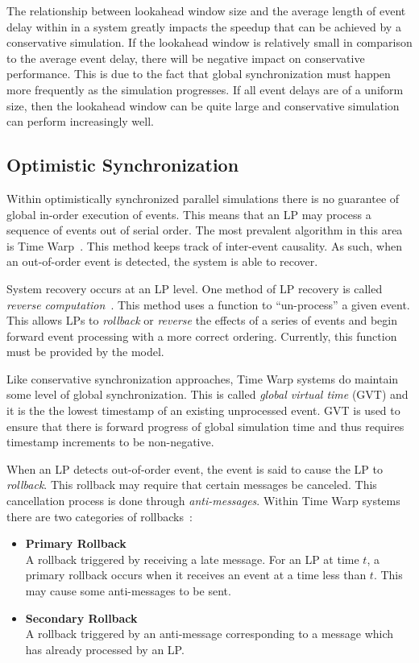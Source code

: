 The relationship between lookahead window size and the average length of event delay within in a system greatly impacts the speedup that can be achieved by a conservative simulation.
If the lookahead window is relatively small in comparison to the average event delay, there will be negative impact on conservative performance.
This is due to the fact that global synchronization must happen more frequently as the simulation progresses.
If all event delays are of a uniform size, then the lookahead window can be quite large and conservative simulation can perform increasingly well.

\subsection{Optimistic Synchronization}

Within optimistically synchronized parallel simulations there is no guarantee of global in-order execution of events.
This means that an LP may process a sequence of events out of serial order.
The most prevalent algorithm in this area is Time Warp~\cite{jefferson-tw}.
This method keeps track of inter-event causality.
As such, when an out-of-order event is detected, the system is able to recover.

System recovery occurs at an LP level.
One method of LP recovery is called \textit{reverse computation}~\cite{carothers-rc}.
This method uses a function to ``un-process'' a given event.
This allows LPs to \textit{rollback} or \textit{reverse} the effects of a series of events and begin forward event processing with a more correct ordering.
Currently, this function must be provided by the model.

Like conservative synchronization approaches, Time Warp systems do maintain some level of global synchronization.
This is called \textit{global virtual time} (GVT) and it is the the lowest timestamp of an existing unprocessed event.
GVT is used to ensure that there is forward progress of global simulation time and thus requires timestamp increments to be non-negative.

When an LP detects out-of-order event, the event is said to cause the LP to {\it rollback}.
This rollback may require that certain messages be canceled.
This cancellation process is done through {\it anti-messages}.
Within Time Warp systems there are two categories of rollbacks~\cite{Fujimoto:2000fk}:
\begin{itemize}
\item {\bf Primary Rollback}\\
  A rollback triggered by receiving a late message.
  For an LP at time $t$, a primary rollback occurs when it receives an event at a time less than $t$.
  This may cause some anti-messages to be sent.
\item {\bf Secondary Rollback}\\
  A rollback triggered by an anti-message corresponding to a message which has already processed by an LP.
\end{itemize}

